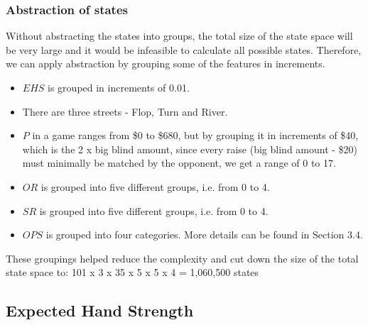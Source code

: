 \documentclass{article}
\begin{document}
\subsubsection{Abstraction of states}
Without abstracting the states into groups, the total size of the state space will be very large and it would be infeasible to calculate all possible states. Therefore, we can apply abstraction by grouping some of the features in increments.
\begin{itemize}
  \item $EHS$ is grouped in increments of 0.01.
  \item There are three streets - Flop, Turn and River.
  \item $P$ in a game ranges from \$0 to \$680, but by grouping it in increments of \$40, which is the 2 x big blind amount, since every raise (big blind amount - \$20) must minimally be matched by the opponent, we get a range of 0 to 17.
  \item $OR$ is grouped into five different groups, i.e. from 0 to 4.
  \item $SR$ is grouped into five different groups, i.e. from 0 to 4.
  \item $OPS$ is grouped into four categories. More details can be found in Section 3.4.
\end{itemize}

These groupings helped reduce the complexity and cut down the size of the total state space to: 101 x 3 x 35 x 5 x 5 x 4 = 1,060,500 states


\subsection{Expected Hand Strength}
\end{document}
